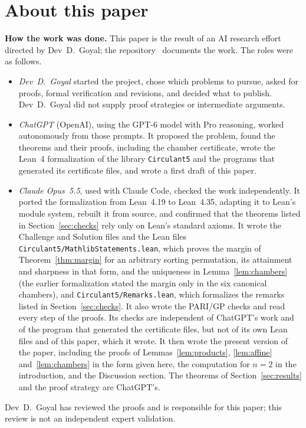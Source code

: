 \documentclass[11pt,a4paper]{article}
\theoremstyle{definition}
\theoremstyle{remark}
\newcommand{\para}[1]{\par\medskip\noindent\textbf{#1}\enspace}
\begin{document}
\section*{About this paper}\label{sec:about}
\para{How the work was done.}
This paper is the result of an AI research effort directed by Dev~D.~Goyal; the repository~\cite{repo} documents the
work. The roles were as follows.
\begin{itemize}
\item \emph{Dev~D.~Goyal} started the project, chose which problems to pursue, asked for proofs, formal verification and
revisions, and decided what to publish. Dev~D.~Goyal did not supply proof strategies or intermediate arguments.
\item \emph{ChatGPT} (OpenAI), using the GPT-6 model with Pro reasoning, worked autonomously from those prompts. It proposed
the problem, found the theorems and their proofs, including the chamber certificate, wrote the Lean~4 formalization of
the library \texttt{Circulant5} and the programs that generated its certificate files, and wrote a first draft of this
paper.
\item \emph{Claude Opus~5.5}, used with Claude Code, checked the work independently. It ported the formalization from
Lean~4.19 to Lean~4.35, adapting it to Lean's module system, rebuilt it from source, and confirmed that the theorems
listed in Section~\ref{sec:checks} rely only on Lean's standard axioms. It wrote the Challenge and Solution files and the
Lean files \texttt{Circulant5/\allowbreak{}MathlibStatements.lean}, which proves the margin of
Theorem~\ref{thm:margin} for an arbitrary sorting permutation, its attainment and sharpness in that form, and the
uniqueness in Lemma~\ref{lem:chambers} (the earlier formalization stated the margin only in the six canonical
chambers), and \texttt{Circulant5/\allowbreak{}Remarks.lean}, which formalizes the remarks listed in
Section~\ref{sec:checks}. It also wrote the PARI/GP checks and read every step of the proofs. Its checks are
independent of ChatGPT's work and of the program that generated the certificate files, but not of its own Lean files
and of this paper, which it wrote. It then wrote the
present version of the paper, including the proofs of Lemmas~\ref{lem:products}, \ref{lem:affine}
and~\ref{lem:chambers} in the form given here, the computation for $n=2$ in the introduction, and the Discussion
section. The theorems of Section~\ref{sec:results} and the proof strategy are ChatGPT's.
\end{itemize}
Dev~D.~Goyal has reviewed the proofs and is responsible for this paper; this review is not an independent expert
validation.
\end{document}
